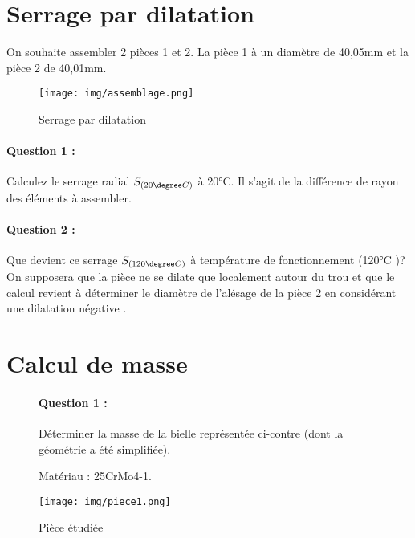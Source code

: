 

\section{Serrage par dilatation}

On souhaite assembler 2 pièces 1 et 2. La pièce 1 à un diamètre de 40,05mm et la pièce 2 de 40,01mm. 

\begin{figure}[!h]
  \centering\texttt{[image: img/assemblage.png]}
  \caption{Serrage par dilatation}
  \label{img:image1}
\end{figure}

\paragraph{Question 1 :} Calculez le serrage radial $S_{(20\degree C)}$ à 20°C. Il s'agit de la différence de rayon des éléments à assembler.

\paragraph{Question 2 :} Que devient ce serrage $S_{(120\degree C)}$ à température de fonctionnement (120°C )? On supposera que la pièce ne se dilate que localement autour du trou et que le calcul revient à déterminer le diamètre de l'alésage de la pièce 2 en considérant une \og dilatation négative \fg.
 
\section{Calcul de masse}

\begin{figure}[!h]
 \begin{minipage}{0.6\linewidth}

\paragraph{Question 1 :} Déterminer la masse de la bielle représentée ci-contre (dont la géométrie a été simplifiée). 
 
Matériau : 25CrMo4-1. 
 \end{minipage}
\hfill
 \begin{minipage}{0.35\linewidth}
  \centering\texttt{[image: img/piece1.png]}
  \caption{Pièce étudiée}
  \label{img:image2}
 \end{minipage}
\end{figure}
 
